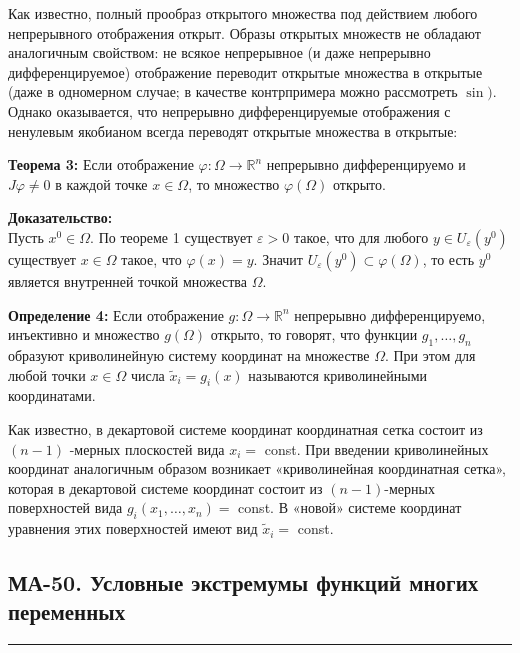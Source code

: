 \documentclass[a4paper,12pt]{article} %
\newcommand{\HRule}{\rule{\linewidth}{0.5mm}}
\begin{document}
Как известно, полный прообраз открытого множества под действием любого непрерывного отображения открыт. Образы открытых множеств не обладают аналогичным свойством: не всякое непрерывное (и даже непрерывно дифференцируемое) отображение переводит открытые множества в открытые (даже в одномерном случае; в качестве контрпримера можно рассмотреть $\sin )$. Однако оказывается, что непрерывно дифференцируемые отображения с ненулевым якобианом всегда переводят открытые множества в открытые:

\textbf{Теорема 3:} Если отображение $\varphi: \Omega \rightarrow \mathbb{R}^{n}$ непрерывно дифференцируемо и $J \varphi \neq 0$ в каждой точке $x \in \Omega$, то множество $\varphi(\Omega)$ открыто.

\textbf{Доказательство:}\\
Пусть $x^{0} \in \Omega$. По теореме 1 существует $\varepsilon>0$ такое, что для любого $y \in U_{\varepsilon}\left(y^{0}\right)$ существует $x \in \Omega$ такое, что $\varphi(x)=y$. Значит $U_{\varepsilon}\left(y^{0}\right) \subset \varphi(\Omega)$, то есть $y^{0}$ является внутренней точкой множества $\Omega$.

\textbf{Определение 4:} Если отображение $g: \Omega \rightarrow \mathbb{R}^{n}$ непрерывно дифференцируемо, инъективно и множество $g(\Omega)$ открыто, то говорят, что функции $g_{1}, \ldots, g_{n}$ образуют криволинейную систему координат на множестве $\Omega$. При этом для любой точки $x \in \Omega$ числа $\tilde{x}_{i}=g_{i}(x)$ называются криволинейными координатами.

Как известно, в декартовой системе координат координатная сетка состоит из $(n-1)$ -мерных плоскостей вида $x_i=$ const. При введении криволинейных координат
аналогичным образом возникает «криволинейная координатная сетка», которая в декартовой системе координат состоит из $(n-1)$-мерных поверхностей вида $g_i\left(x_1, \ldots, x_n\right)=$ const. В «новой» системе координат уравнения этих поверхностей имеют вид $\tilde{x}_i=$ const.


\newpage
\begin{LARGE}
\begin{center}
	\section{МА-50. Условные экстремумы функций многих переменных }
\end{center}
\end{LARGE}
\HRule \\
\end{document}
